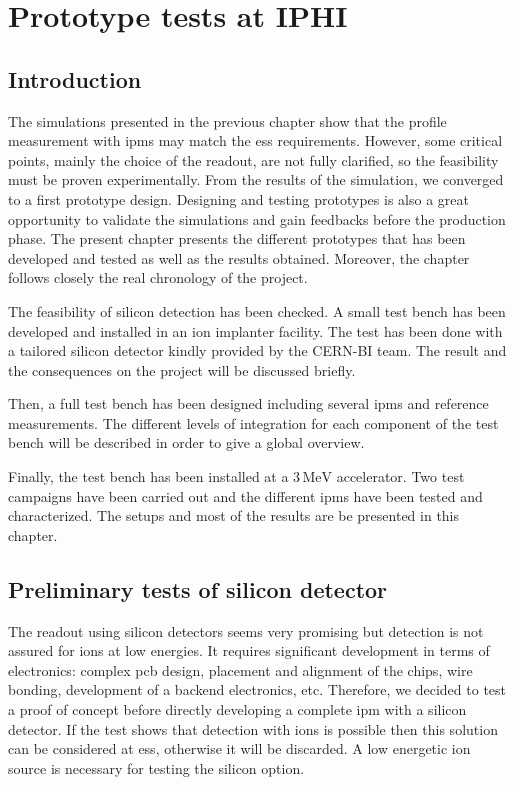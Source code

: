 \chapter{Prototype tests at IPHI}
\cleardoublepage

\minitoc

\section{Introduction}
\begin{refsection}
  \label{ch4:Introduction}
  The simulations presented in the previous chapter show that the profile measurement with \acrshort{ipm}s may match the \acrshort{ess} requirements. However, some critical points, mainly the choice of the readout, are not fully clarified, so the feasibility must be proven experimentally. From the results of the simulation, we converged to a first prototype design. Designing and testing prototypes is also a great opportunity to validate the simulations and gain feedbacks before the production phase. The present chapter presents the different prototypes that has been developed and tested as well as the results obtained. Moreover, the chapter follows closely the real chronology of the project.

  The feasibility of silicon detection has been checked. A small test bench has been developed and installed in an ion implanter facility. The test has been done with a tailored silicon detector kindly provided by the CERN-BI team. The result and the consequences on the project will be discussed briefly.

  Then, a full test bench has been designed including several \acrshort{ipm}s and reference measurements. The different levels of integration for each component of the test bench will be described in order to give a global overview.

  Finally, the test bench has been installed at a $3\,\mathrm{MeV}$ accelerator. Two test campaigns have been carried out and the different \acrshort{ipm}s have been tested and characterized. The setups and most of the results are be presented in this chapter.

  \section{Preliminary tests of silicon detector}
  The readout using silicon detectors seems very promising but detection is not assured for ions at low energies. It requires significant development in terms of electronics: complex \acrshort{pcb} design, placement and alignment of the chips, wire bonding, development of a backend electronics, etc. Therefore, we decided to test a proof of concept before directly developing a complete \acrshort{ipm} with a silicon detector. If the test shows that detection with ions is possible then this solution can be considered at \acrshort{ess}, otherwise it will be discarded. A low energetic ion source is necessary for testing the silicon option.


\end{refsection}
